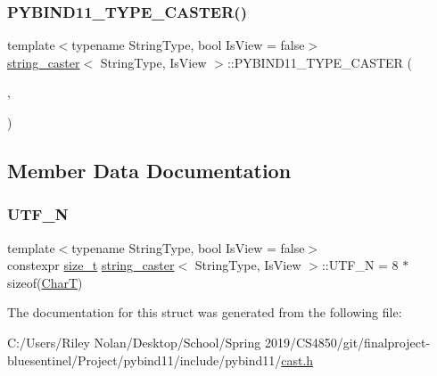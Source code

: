 \subsubsection{\texorpdfstring{PYBIND11\_TYPE\_CASTER()}{PYBIND11\_TYPE\_CASTER()}}
{\footnotesize\ttfamily template$<$typename String\+Type, bool Is\+View = false$>$ \\
\mbox{\hyperlink{structstring__caster}{string\+\_\+caster}}$<$ String\+Type, Is\+View $>$\+::P\+Y\+B\+I\+N\+D11\+\_\+\+T\+Y\+P\+E\+\_\+\+C\+A\+S\+T\+ER (\begin{DoxyParamCaption}\item[{String\+Type}]{,  }\item[{\mbox{\hyperlink{descr_8h_af114703e20c6527e87163eb2798f74b8}{\+\_\+}}(\mbox{\hyperlink{detail_2common_8h_a4490c1733364f04fcea017da2eb38d38}{P\+Y\+B\+I\+N\+D11\+\_\+\+S\+T\+R\+I\+N\+G\+\_\+\+N\+A\+ME}})}]{ }\end{DoxyParamCaption})}



\subsection{Member Data Documentation}
\mbox{\label{structstring__caster_a1d6a90921b8dd893b6feecfa98859d28}} 
\subsubsection{\texorpdfstring{UTF\_N}{UTF\_N}}
{\footnotesize\ttfamily template$<$typename String\+Type, bool Is\+View = false$>$ \\
constexpr \mbox{\hyperlink{detail_2common_8h_a801d6a451a01953ef8cbae6feb6a3638}{size\+\_\+t}} \mbox{\hyperlink{structstring__caster}{string\+\_\+caster}}$<$ String\+Type, Is\+View $>$\+::U\+T\+F\+\_\+N = 8 $\ast$ sizeof(\mbox{\hyperlink{structstring__caster_a0d5228e9253c85b930b6230662f2f60c}{CharT}})\hspace{0.3cm}{\ttfamily [static]}}



The documentation for this struct was generated from the following file\+:\begin{DoxyCompactItemize}
\item 
C\+:/\+Users/\+Riley Nolan/\+Desktop/\+School/\+Spring 2019/\+C\+S4850/git/finalproject-\/bluesentinel/\+Project/pybind11/include/pybind11/\mbox{\hyperlink{cast_8h}{cast.\+h}}\end{DoxyCompactItemize}

